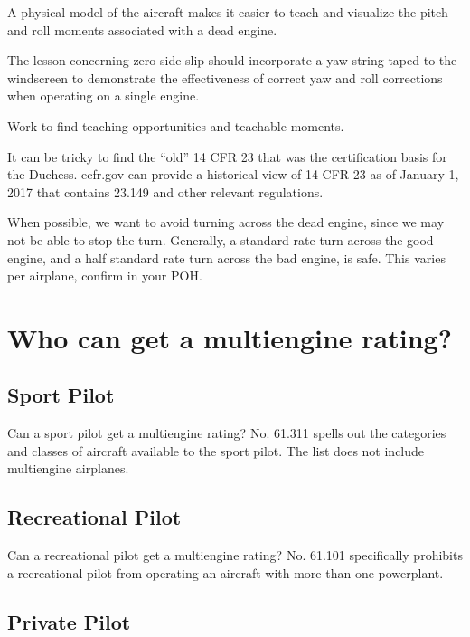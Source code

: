 A physical model of the aircraft makes it easier to teach and visualize the pitch and roll moments
associated with a dead engine.

The lesson concerning zero side slip should incorporate a yaw string taped to the windscreen to demonstrate
the effectiveness of correct yaw and roll corrections when operating on a single engine.

Work to find teaching opportunities and teachable moments.

It can be tricky to find the ``old'' 14 CFR 23 that was the certification basis for the Duchess. ecfr.gov can provide
a historical view of 14 CFR 23 as of January 1, 2017 that contains 23.149 and other relevant regulations.

When possible, we want to avoid turning across the dead engine, since we may not be able to
stop the turn. Generally, a standard rate turn across the good engine, and a half standard rate turn across
the bad engine, is safe. This varies per airplane, confirm in your POH.


\section{Who can get a multiengine rating?}

\subsection{Sport Pilot}

Can a sport pilot get a multiengine rating? No. 61.311 spells out the categories and classes
of aircraft available to the sport pilot. The list does not include multiengine airplanes.

\subsection{Recreational Pilot}

Can a recreational pilot get a multiengine rating? No. 61.101 specifically prohibits
a recreational pilot from operating an aircraft with more than one powerplant.

\subsection{Private Pilot}

